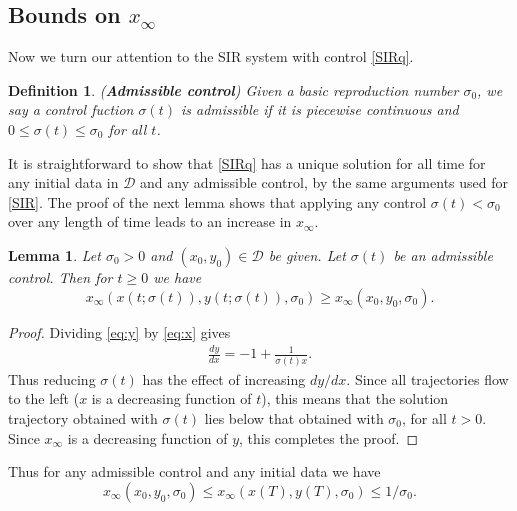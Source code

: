 \documentclass[english,12pt,letter]{article}
\newtheorem{lem}{Lemma}
\newtheorem{dfn}{Definition}
\newcommand{\Rnot}{\sigma_0}
\newcommand{\Sinf}{x_\infty}
\newcommand{\dom}{{\mathcal D}}
\begin{document}
\subsection{Bounds on $\Sinf$}
Now we turn our attention to the SIR system with control \eqref{SIRq}.

\begin{dfn} ({\bf Admissible control})
Given a basic reproduction number $\Rnot$, we say a control fuction $\sigma(t)$ is
admissible if it is piecewise continuous and $0\le \sigma(t) \le \sigma_0$ for all $t$.
\end{dfn}

It is straightforward to show that \eqref{SIRq} has a unique solution for all time
for any initial data in $\dom$ and any admissible control, by the same
arguments used for \eqref{SIR}.
The proof of the next lemma shows that applying any control $\sigma(t)<\Rnot$ over
any length of time leads to an increase in $x_\infty$.
\begin{lem}
Let $\Rnot>0$ and $(x_0,y_0)\in\dom$ be given. %
Let $\sigma(t)$ be an admissible control.  Then for $t\ge0$ we have
$$
    x_\infty(x(t;\sigma(t)),y(t;\sigma(t)),\Rnot) \ge x_\infty(x_0,y_0,\Rnot).
$$
\end{lem}
\begin{proof}
    Dividing \eqref{eq:y} by \eqref{eq:x} gives
    \begin{align} \label{eq:dydx}
        \frac{dy}{dx} = -1 + \frac{1}{\sigma(t) x}.
    \end{align}
    Thus reducing $\sigma(t)$ has the effect of increasing $dy/dx$.
    Since all trajectories flow to the left ($x$ is a decreasing function of $t$),
    this means that the solution trajectory obtained with $\sigma(t)$ lies
    below that obtained with $\sigma_0$, for all $t>0$.  Since
    $\Sinf$ is a decreasing function of $y$, this completes the proof.
\end{proof}

Thus for any admissible control and any initial data we have
$$
\Sinf(x_0,y_0,\Rnot) \le \Sinf(x(T),y(T),\Rnot) \le 1/\Rnot.
$$
\end{document}
